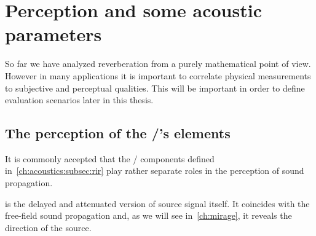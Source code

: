 \section{Perception and some acoustic parameters}\label{ch:acoustics:sec:perception}
So far we have analyzed reverberation from a purely mathematical point of view.
However in many applications it is important to correlate physical measurements to subjective and perceptual qualities.
This will be important in order to define evaluation scenarios later in this thesis.
\subsection{The perception of the \RIR/'s elements}
It is commonly accepted that the \RIR/ components defined in~\cref{ch:acoustics:subsec:rir} play rather separate roles in the perception of sound propagation.

 is the delayed and attenuated version of source signal itself.
It coincides with the free-field sound propagation and, as we will see in~\cref{ch:mirage}, it reveals the direction of the source.

